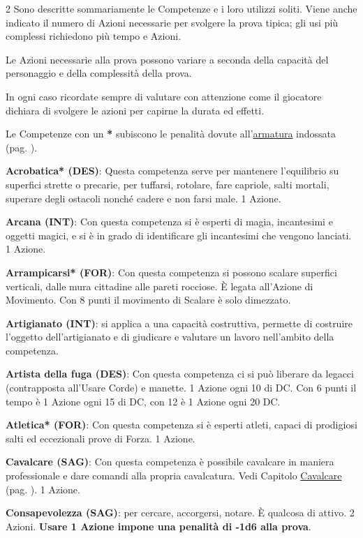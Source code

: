 \begin{multicols}{2}
Sono descritte sommariamente le Competenze e i loro utilizzi soliti. Viene anche indicato il numero di Azioni necessarie per svolgere la prova tipica; gli usi più complessi richiedono più tempo e Azioni.

Le Azioni necessarie alla prova possono variare a seconda della capacità del personaggio e della complessità della prova.

In ogni caso ricordate sempre di valutare con attenzione come il giocatore dichiara di svolgere le azioni per capirne la durata ed effetti.

Le Competenze con un \textbf{*} subiscono le penalità dovute all'\hyperlink{equipaggiamento.armature.scudi}{armatura} indossata (pag. \pageref{equipaggiamentoarmature}).

\medskip

\textbf{Acrobatica* (DES)}: Questa competenza serve per mantenere l'equilibrio su superfici strette o precarie, per tuffarsi, rotolare, fare capriole, salti mortali, superare degli ostacoli nonché cadere e non farsi male. 1 Azione.

\textbf{Arcana (INT)}: Con questa competenza si è esperti di magia, incantesimi e oggetti magici, e si è in grado di identificare gli incantesimi che vengono lanciati. 1 Azione.

\textbf{Arrampicarsi* (FOR)}: Con questa competenza si possono scalare superfici verticali, dalle mura cittadine alle pareti rocciose. È legata all'Azione di Movimento. Con 8 punti il movimento di Scalare è solo dimezzato.

\textbf{Artigianato (INT)}: si applica a una capacità costruttiva, permette di costruire l'oggetto dell'artigianato e di giudicare e valutare un lavoro nell'ambito della competenza.

\textbf{Artista della fuga (DES)}: Con questa competenza ci si può liberare da legacci (contrapposta all'Usare Corde) e manette. 1 Azione ogni 10 di DC. Con 6 punti il tempo è 1 Azione ogni 15 di DC, con 12 è 1 Azione ogni 20 DC.\label{artistadellafuga}

\textbf{Atletica* (FOR)}: Con questa competenza si è esperti atleti, capaci di prodigiosi salti ed eccezionali prove di Forza. 1 Azione.

\textbf{Cavalcare (SAG)}: Con questa competenza è possibile cavalcare in maniera professionale e dare comandi alla propria cavalcatura. Vedi Capitolo \hyperlink{cavalcare}{Cavalcare} (pag. \pageref{cavalcare}). 1 Azione.

\textbf{Consapevolezza (SAG)}: per cercare, accorgersi, notare. È qualcosa di attivo. 2 Azioni. \textbf{Usare 1 Azione impone una penalità di -1d6 alla prova}.


\end{multicols}
